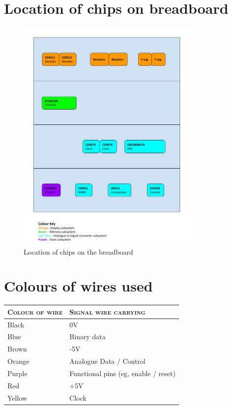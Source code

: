 \chapter{Location of chips on breadboard}
\begin{figure}[H]
    \centering
    \includegraphics[width=0.8\textwidth]{images/locationOfChipsOnBreadboardUpdated.jpg}
    \caption{Location of chips on the breadboard}
    \label{fig:locationOfChipsOnBreadboard}
\end{figure}


\chapter{Colours of wires used}

\begin{table} [H]
\centering
\begin{tabularx}{0.8\textwidth} { X | X }
 
     \textsc{Colour of wire} & \textsc{Signal wire carrying} \\
     \hline
     \color{black}Black & \color{black}0V \\  
     \color{blue}Blue & \color{black} Binary data \\
     \color{brown}Brown & \color{black}-5V \\
     \color{orange}Orange & \color{black}Analogue Data / Control \\
     \color{purple}Purple & \color{black}Functional pins (eg, enable / reset) \\
     \color{red} Red & \color{black} +5V \\
     \color{yellow}Yellow & \color{black}Clock \\

\end{tabularx}
\end{table}

